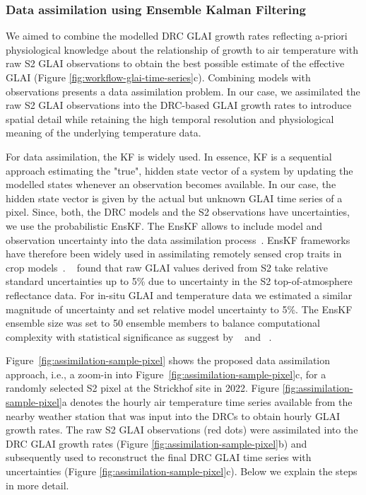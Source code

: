 \subsubsection{Data assimilation using Ensemble Kalman Filtering}
We aimed to combine the modelled \gls{DRC} \gls{GLAI} growth rates reflecting a-priori physiological knowledge about the relationship of growth to air temperature with raw \gls{S2} \gls{GLAI} observations to obtain the best possible estimate of the effective \gls{GLAI} (Figure \ref{fig:workflow-glai-time-series}c). Combining models with observations presents a data assimilation problem. In our case, we assimilated the raw \gls{S2} \gls{GLAI} observations into the \gls{DRC}-based \gls{GLAI} growth rates to introduce spatial detail while retaining the high temporal resolution and physiological meaning of the underlying temperature data.

For data assimilation, the \gls{KF} is widely used. In essence, \gls{KF} is a sequential approach estimating the "true", hidden state vector of a system by updating the modelled states whenever an observation becomes available. In our case, the hidden state vector is given by the actual but unknown \gls{GLAI} time series of a pixel. Since, both, the \gls{DRC} models and the \gls{S2} observations have uncertainties, we use the probabilistic \gls{EnsKF}. The \gls{EnsKF} allows to include model and observation uncertainty into the data assimilation process~\citep{evensen_ensemble_2003}. \gls{EnsKF} frameworks have therefore been widely used in assimilating remotely sensed crop traits in crop models~\citep{de_wit_crop_2007, zhao_assimilating_2013, huang_assimilating_2016}. ~\cite{graf_propagating_2023} found that raw \gls{GLAI} values derived from \gls{S2} take relative standard uncertainties up to 5\% due to uncertainty in the \gls{S2} top-of-atmosphere reflectance data. For in-situ \gls{GLAI} and temperature data we estimated a similar magnitude of uncertainty and set relative model uncertainty to 5\%. The \gls{EnsKF} ensemble size was set to 50 ensemble members to balance computational complexity with statistical significance as suggest by ~\cite{de_wit_crop_2007} and ~\cite{zhao_assimilating_2013}.

Figure~\ref{fig:assimilation-sample-pixel} shows the proposed data assimilation approach, i.e., a zoom-in into Figure~\ref{fig:assimilation-sample-pixel}c, for a randomly selected \gls{S2} pixel at the Strickhof site in 2022. Figure \ref{fig:assimilation-sample-pixel}a denotes the hourly air temperature time series available from the nearby weather station that was input into the \gls{DRC}s to obtain hourly \gls{GLAI} growth rates. The raw \gls{S2} \gls{GLAI} observations (red dots) were assimilated into the \gls{DRC} \gls{GLAI} growth rates (Figure \ref{fig:assimilation-sample-pixel}b) and subsequently used to reconstruct the final \gls{DRC} \gls{GLAI} time series with uncertainties (Figure \ref{fig:assimilation-sample-pixel}c). Below we explain the steps in more detail.

